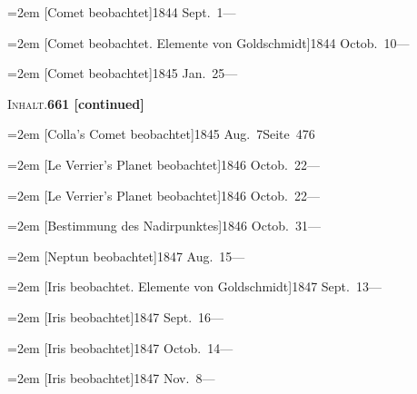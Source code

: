 \documentclass[12pt,a4paper]{article}
\begin{document}
{{{{{{{{{{\vspace{0.5mm}
\noindent\hangindent=2em
[Comet beobachtet]\hfill 1844 Sept.\ 1\quad ---

\vspace{0.5mm}
\noindent\hangindent=2em
[Comet beobachtet. Elemente von Goldschmidt]\hfill 1844 Octob.\ 10\quad ---

\vspace{0.5mm}
\noindent\hangindent=2em
[Comet beobachtet]\hfill 1845 Jan.\ 25\quad ---

\newpage

\begin{center}\small\textsc{Inhalt.}\quad\textbf{661 [continued]}\end{center}

\vspace{0.3cm}

{\small
\noindent\hangindent=2em
[Colla's Comet beobachtet]\hfill 1845 Aug.\ 7\quad Seite\ 476

\vspace{0.5mm}
\noindent\hangindent=2em
[Le Verrier's Planet beobachtet]\hfill 1846 Octob.\ 22\quad ---

\vspace{0.5mm}
\noindent\hangindent=2em
[Le Verrier's Planet beobachtet]\hfill 1846 Octob.\ 22\quad ---

\vspace{0.5mm}
\noindent\hangindent=2em
[Bestimmung des Nadirpunktes]\hfill 1846 Octob.\ 31\quad ---

\vspace{0.5mm}
\noindent\hangindent=2em
[Neptun beobachtet]\hfill 1847 Aug.\ 15\quad ---

\vspace{0.5mm}
\noindent\hangindent=2em
[Iris beobachtet. Elemente von Goldschmidt]\hfill 1847 Sept.\ 13\quad ---

\vspace{0.5mm}
\noindent\hangindent=2em
[Iris beobachtet]\hfill 1847 Sept.\ 16\quad ---

\vspace{0.5mm}
\noindent\hangindent=2em
[Iris beobachtet]\hfill 1847 Octob.\ 14\quad ---

\vspace{0.5mm}
\noindent\hangindent=2em
[Iris beobachtet]\hfill 1847 Nov.\ 8\quad ---

}}}}}}}}}}}
\end{document}

